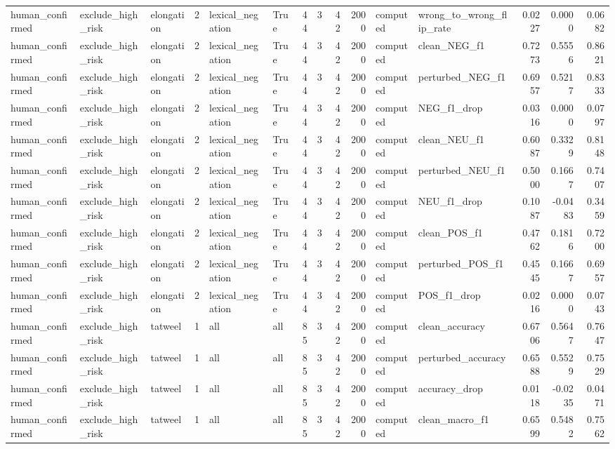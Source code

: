 \begin{tabular}{lllrllrrrrllrrr}
human_confirmed & exclude_high_risk & elongation & 2 & lexical_negation & True & 44 & 3 & 42 & 2000 & computed & wrong_to_wrong_flip_rate & 0.0227 & 0.0000 & 0.0682 \\
human_confirmed & exclude_high_risk & elongation & 2 & lexical_negation & True & 44 & 3 & 42 & 2000 & computed & clean_NEG_f1 & 0.7273 & 0.5556 & 0.8621 \\
human_confirmed & exclude_high_risk & elongation & 2 & lexical_negation & True & 44 & 3 & 42 & 2000 & computed & perturbed_NEG_f1 & 0.6957 & 0.5217 & 0.8333 \\
human_confirmed & exclude_high_risk & elongation & 2 & lexical_negation & True & 44 & 3 & 42 & 2000 & computed & NEG_f1_drop & 0.0316 & 0.0000 & 0.0797 \\
human_confirmed & exclude_high_risk & elongation & 2 & lexical_negation & True & 44 & 3 & 42 & 2000 & computed & clean_NEU_f1 & 0.6087 & 0.3329 & 0.8148 \\
human_confirmed & exclude_high_risk & elongation & 2 & lexical_negation & True & 44 & 3 & 42 & 2000 & computed & perturbed_NEU_f1 & 0.5000 & 0.1667 & 0.7407 \\
human_confirmed & exclude_high_risk & elongation & 2 & lexical_negation & True & 44 & 3 & 42 & 2000 & computed & NEU_f1_drop & 0.1087 & -0.0483 & 0.3459 \\
human_confirmed & exclude_high_risk & elongation & 2 & lexical_negation & True & 44 & 3 & 42 & 2000 & computed & clean_POS_f1 & 0.4762 & 0.1816 & 0.7200 \\
human_confirmed & exclude_high_risk & elongation & 2 & lexical_negation & True & 44 & 3 & 42 & 2000 & computed & perturbed_POS_f1 & 0.4545 & 0.1667 & 0.6957 \\
human_confirmed & exclude_high_risk & elongation & 2 & lexical_negation & True & 44 & 3 & 42 & 2000 & computed & POS_f1_drop & 0.0216 & 0.0000 & 0.0743 \\
human_confirmed & exclude_high_risk & tatweel & 1 & all & all & 85 & 3 & 42 & 2000 & computed & clean_accuracy & 0.6706 & 0.5647 & 0.7647 \\
human_confirmed & exclude_high_risk & tatweel & 1 & all & all & 85 & 3 & 42 & 2000 & computed & perturbed_accuracy & 0.6588 & 0.5529 & 0.7529 \\
human_confirmed & exclude_high_risk & tatweel & 1 & all & all & 85 & 3 & 42 & 2000 & computed & accuracy_drop & 0.0118 & -0.0235 & 0.0471 \\
human_confirmed & exclude_high_risk & tatweel & 1 & all & all & 85 & 3 & 42 & 2000 & computed & clean_macro_f1 & 0.6599 & 0.5482 & 0.7562 \\

\end{tabular}

